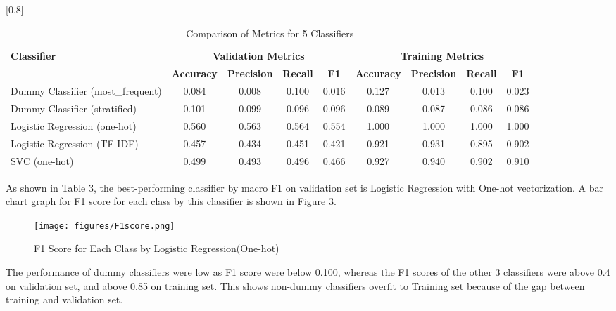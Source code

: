 \documentclass[a4paper,11pt]{article}
\begin{document}
\begin{table}[htbp]
    \centering
    \caption{Comparison of Metrics for 5 Classifiers}
    \label{tab:classifier_metrics}
    \small
    \scalebox{0.8}[0.8]{
    \begin{tabular}{l|cccc|cccc}
        \hline
        \textbf{Classifier} & \multicolumn{4}{c|}{\textbf{Validation Metrics}} & \multicolumn{4}{c}{\textbf{Training Metrics}} \\
        & \textbf{Accuracy} & \textbf{Precision} & \textbf{Recall} & \textbf{F1} & \textbf{Accuracy} & \textbf{Precision} & \textbf{Recall} & \textbf{F1} \\
        \hline
        Dummy Classifier (most\_frequent) & {0.084} & 0.008 & 0.100 & 0.016 & 0.127 & 0.013 & 0.100 & 0.023 \\
        Dummy Classifier (stratified) & 0.101 & 0.099 & 0.096 & 0.096 & 0.089 & 0.087 & 0.086 & 0.086 \\
        \rowcolor[rgb]{0.9,0.9,0}Logistic Regression (one-hot) & \colorbox[rgb]{0.9, 0.9, 0}{0.560} & \colorbox[rgb]{0.9, 0.9, 0}{0.563} & \colorbox[rgb]{0.9, 0.9, 0}{0.564} & \colorbox[rgb]{0.9, 0.9, 0}{0.554} & 1.000 & 1.000 & 1.000 & 1.000 \\
        Logistic Regression (TF-IDF) & 0.457 & 0.434 & 0.451 & 0.421 & 0.921 & 0.931 & 0.895 & 0.902 \\
        SVC (one-hot) & 0.499 & 0.493 & 0.496 & 0.466 & 0.927 & 0.940 & 0.902 & 0.910 \\
        \hline
    \end{tabular}
    }
\end{table}

As shown in Table 3, the best-performing classifier by macro F1 on validation set is Logistic Regression with One-hot vectorization.
A bar chart graph for F1 score for each class by this classifier is shown in Figure 3.
\begin{figure}[htbp]
  \begin{center}
  \texttt{[image: figures/F1score.png]}
  \caption{F1 Score for Each Class by Logistic Regression(One-hot)}
  \end{center}
\end{figure}

The performance of dummy classifiers were low as F1 score were below 0.100,
whereas the F1 scores of the other 3 classifiers were above 0.4 on validation set,
and above 0.85 on training set.
This shows non-dummy classifiers overfit to Training set because of the gap between training and validation set.
\end{document}
